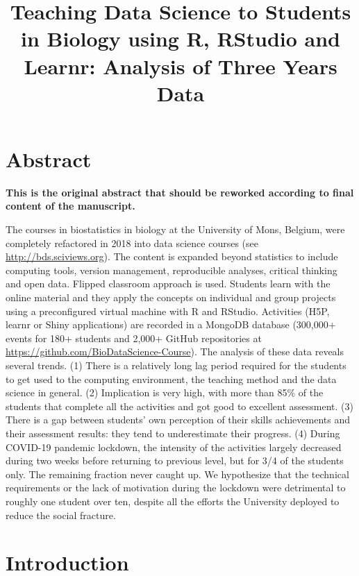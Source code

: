\documentclass[
]{article}
\title{Teaching Data Science to Students in Biology using R, RStudio and
Learnr: Analysis of Three Years Data}
\author{}
\date{\vspace{-2.5em}}
\begin{document}
\maketitle

\hypertarget{abstract}{%
\section{Abstract}\label{abstract}}

\textbf{This is the original abstract that should be reworked according
to final content of the manuscript.}

The courses in biostatistics in biology at the University of Mons,
Belgium, were completely refactored in 2018 into data science courses
(see \url{http://bds.sciviews.org}). The content is expanded beyond
statistics to include computing tools, version management, reproducible
analyses, critical thinking and open data. Flipped classroom approach is
used. Students learn with the online material and they apply the
concepts on individual and group projects using a preconfigured virtual
machine with R and RStudio. Activities (H5P, learnr or Shiny
applications) are recorded in a MongoDB database (300,000+ events for
180+ students and 2,000+ GitHub repositories at
\url{https://github.com/BioDataScience-Course}). The analysis of these
data reveals several trends. (1) There is a relatively long lag period
required for the students to get used to the computing environment, the
teaching method and the data science in general. (2) Implication is very
high, with more than 85\% of the students that complete all the
activities and got good to excellent assessment. (3) There is a gap
between students' own perception of their skills achievements and their
assessment results: they tend to underestimate their progress. (4)
During COVID-19 pandemic lockdown, the intensity of the activities
largely decreased during two weeks before returning to previous level,
but for 3/4 of the students only. The remaining fraction never caught
up. We hypothesize that the technical requirements or the lack of
motivation during the lockdown were detrimental to roughly one student
over ten, despite all the efforts the University deployed to reduce the
social fracture.

\hypertarget{introduction}{%
\section{Introduction}\label{introduction}}
\end{document}
